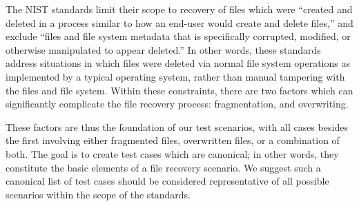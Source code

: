 The NIST standards limit their scope to recovery of files which were ``created and deleted in a process similar to how an end-user would create and delete files,''\cite{meta:dfr:standards} and exclude ``files and file system metadata that is specifically corrupted, modified, or otherwise manipulated to appear deleted.''\cite{meta:dfr:standards}
In other words, these standards address situations in which files were deleted via normal file system operations as implemented by a typical operating system, rather than manual tampering with the files and file system.
Within these constraints, there are two factors which can significantly complicate the file recovery process: 
fragmentation, and overwriting. 

These factors are thus the foundation of our test scenarios, with all cases besides the first involving either fragmented files, overwritten files, or a combination of both. 
The goal is to create test cases which are canonical; in other words, they constitute the basic elements of a file recovery scenario.
We suggest such a canonical list of test cases should be considered representative of all possible scenarios within the scope of the standards.

